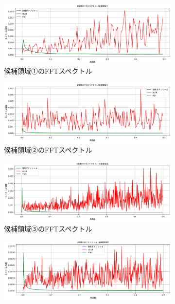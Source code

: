 \documentclass[a4paper,12pt]{article}
\begin{document}
\begin{figure}[H]
    \centering
    \begin{subfigure}{0.48\linewidth}
        \includegraphics[width=\linewidth]{S1_fft_spectre_seq1.png}
        \caption{候補領域①のFFTスペクトル}
        \label{fig:supp_fft_region1}
    \end{subfigure}
    \hfill
    \begin{subfigure}{0.48\linewidth}
        \includegraphics[width=\linewidth]{S1_fft_spectre_seq2.png}
        \caption{候補領域②のFFTスペクトル}
        \label{fig:supp_fft_region2}
    \end{subfigure}
    \vspace{1cm}
    \begin{subfigure}{0.48\linewidth}
        \includegraphics[width=\linewidth]{S1_fft_spectre_seq3.png}
        \caption{候補領域③のFFTスペクトル}
        \label{fig:supp_fft_region3}
    \end{subfigure}
    \hfill
    \begin{subfigure}{0.48\linewidth}
        \includegraphics[width=\linewidth]{S1_fft_spectre_seq4.png}

\end{subfigure}
\end{figure}
\end{document}
